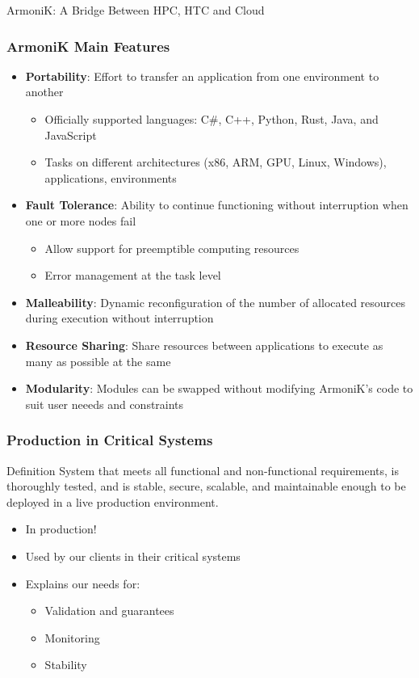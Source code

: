 \documentclass[10pt,aspectratio=1609]{beamer}
\begin{document}
\begin{section}{ArmoniK: A Bridge Between HPC, HTC and Cloud}
  \begin{frame}
    \frametitle{ArmoniK Main Features}
    \begin{itemize}
      \item \textbf{Portability}: Effort to transfer an application from one environment to another
      \begin{itemize}
        \item Officially supported languages: C\#, C++, Python, Rust, Java, and JavaScript
        \item Tasks on different architectures (x86, ARM, GPU, Linux, Windows), applications, environments
      \end{itemize}
      \item \textbf{Fault Tolerance}: Ability to continue functioning without interruption when one or more nodes fail
      \begin{itemize}
        \item Allow support for preemptible computing resources
        \item Error management at the task level
      \end{itemize}
      \item \textbf{Malleability}: Dynamic reconfiguration of the number of allocated resources during execution without interruption
      \item \textbf{Resource Sharing}: Share resources between applications to execute as many as possible at the same
      \item \textbf{Modularity}: Modules can be swapped without modifying ArmoniK's code to suit user neeeds and constraints
    
    \end{itemize}
  \end{frame}

  \begin{frame}
    \frametitle{Production in Critical Systems}
    \begin{block}{Definition}
      System that meets all functional and non-functional requirements, is thoroughly tested, and is stable, secure, scalable, and maintainable enough to be deployed in a live production environment.
    \end{block}
    \begin{itemize}
      \item In production!
      \item Used by our clients in their critical systems
      \item Explains our needs for:
      \begin{itemize}
        \item Validation and guarantees
        \item Monitoring
        \item Stability
      \end{itemize}
    \end{itemize}
  \end{frame}

\end{section}
\end{document}

